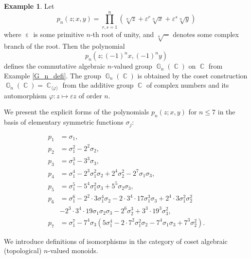 \documentclass[14pt, dvipsnames]{extarticle}
\theoremstyle{plain}
\theoremstyle{definition}
\newtheorem{example}{\bf Example}
\theoremstyle{remark}
\let\phi\varphi
\DeclareMathOperator{\G}{\mathbb{G}}
\DeclareMathOperator{\Cc}{\mathbb{C}}
\DeclareMathOperator{\eps}{\varepsilon}
\renewcommand{\epsilon}{\varepsilon}
\begin{document}
\begin{example}\label{G_n}
Let
\begin{equation}\label{p_n}
p_n(z; x, y) = \prod\limits_{r, s = 1}^{n}(\sqrt[n]{z} + \varepsilon^r\sqrt[n]{x} + \varepsilon^s\sqrt[n]{y})
\end{equation}
where $\eps$ is some primitive $n$-th root of unity, and $\sqrt[n]{-}$ denotes some complex branch of the root. Then the polynomial
$$p_n(z; (-1)^nx, (-1)^ny)$$
defines the commutative algebraic $n$-valued group $\G_n(\Cc)$ on $\Cc$ from Example \ref{G_n_defi}. The group $\G_n(\Cc)$ is obtained by the coset construction $\G_n(\Cc) = \Cc_{\langle \phi \rangle}$ from the additive group $\Cc$ of complex numbers and its automorphism $\phi: z\mapsto \epsilon z$ of order $n$. 

We present the explicit forms of the polynomials $p_n(z; x, y)$ for $n\leqslant 7$ in the basis of elementary symmetric functions $\sigma_j$: 

\begin{equation}\label{p_1-p_7}\begin{aligned} 
p_1 &=\sigma_1,\\
p_2 &=\sigma_1^2 -2^2\sigma_2,\\
p_3 &=\sigma_1^3 -3^3\sigma_3,\\
p_4 &=\sigma_1^4 - 2^3\sigma_1^2\sigma_2 + 2^4\sigma_2^2 - 2^7\sigma_1\sigma_3,\\
p_5 & = \sigma_1^5 - 5^4\sigma_1^2\sigma_3 + 5^5\sigma_2\sigma_3,\\
p_6 &=\sigma_1^6 -2^2 \cdot 3\sigma_1^4\sigma_2 -2\cdot3^4 \cdot17\sigma_1^3\sigma_3 +2^4\cdot 3\sigma_1^2\sigma_2^2\\ &-2^3 \cdot 3^4 \cdot 19\sigma_1\sigma_2\sigma_3 -2^6\sigma_2^3 +3^3 \cdot19^3 \sigma_3^2,\\
p_7 &= \sigma_1^7 - 7^4\sigma_3(5\sigma_1^4 - 2 \cdot 7^2\sigma_1^2\sigma_2 - 7^4\sigma_1\sigma_3 + 7^3\sigma_2^2).
\end{aligned}\end{equation}
 
\end{example}


We introduce definitions of isomorphisms in the category of coset algebraic (topological) $n$-valued monoids.
\end{document}
